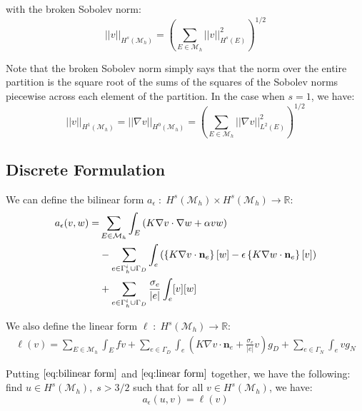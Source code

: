 \documentclass[10pt]{article}
\numberwithin{equation}{section}
\begin{document}
	\noindent with the broken Sobolev norm:
	\begin{equation}
		||v||_{H^{s}(\mathcal{M}_{h})} = \left(\sum_{E\in\mathcal{M}_{h}}||v||^{2}_{H^{s}(E)}\right)^{1/2}
	\end{equation}
	
	\noindent Note that the broken Sobolev norm simply says that the norm over the entire partition is the square root of the sums of the squares of the Sobolev norms piecewise across each element of the partition. In the case when $s=1$, we have:
	\begin{equation}
		||v||_{H^{1}(\mathcal{M}_{h})} = ||\nabla v||_{H^{0}(\mathcal{M}_{h})} = \left(\sum_{E\in\mathcal{M}_{h}}||\nabla v||^{2}_{L^{2}(E)}\right)^{1/2}
	\end{equation}
	
	\subsection{Discrete Formulation}
	We can define the bilinear form $a_{\epsilon}\;:\;H^{s}(\mathcal{M}_{h})\times H^{s}(\mathcal{M}_{h}) \to \mathbb{R}$:
	\begin{align}
		a_{\epsilon}(v,w) = &\sum_{E\in\mathcal{M}_{h}}\int_{E}\left(K\nabla v\cdot\nabla w + \alpha vw\right)\notag\\
		 			     &- \sum_{e\in\Gamma_{h}^{i}\cup\Gamma_{D}}\int_{e}\left(\left\{K\nabla v\cdot\mathbf{n}_{e}\right\}[w] - \epsilon\left\{K\nabla w\cdot\mathbf{n}_{e}\right\}[v]\right)\notag\\
					     &+\sum_{e\in\Gamma_{h}^{i}\cup\Gamma_{D}}\frac{\sigma_{e}}{|e|}\int_{e}[v][w]\label{eq:bilinear form}
	\end{align}
	
	\noindent We also define the linear form $\ell\;:\;H^{s}(\mathcal{M}_{h}) \to \mathbb{R}$:
	\begin{align}
		\ell(v) = \sum_{E\in\mathcal{M}_{h}}\int_{E}fv + \sum_{e\in\Gamma_{D}}\int_{e}\left(K\nabla v\cdot\mathbf{n}_{e} + \frac{\sigma_{e}}{|e|}v\right)g_{D} + \sum_{e\in\Gamma_{N}}\int_{e}vg_{N}\label{eq:linear form}
	\end{align}
	
	\noindent Putting $\eqref{eq:bilinear form}$ and $\eqref{eq:linear form}$ together, we have the following: find $u\in H^{s}(\mathcal{M}_{h}),\;s>3/2$ such that for all $v\in H^{s}(\mathcal{M}_{h})$, we have:
	\begin{equation}
		a_{\epsilon}(u,v) = \ell(v) \label{eq:discrete form}
	\end{equation}
	
\end{document}
